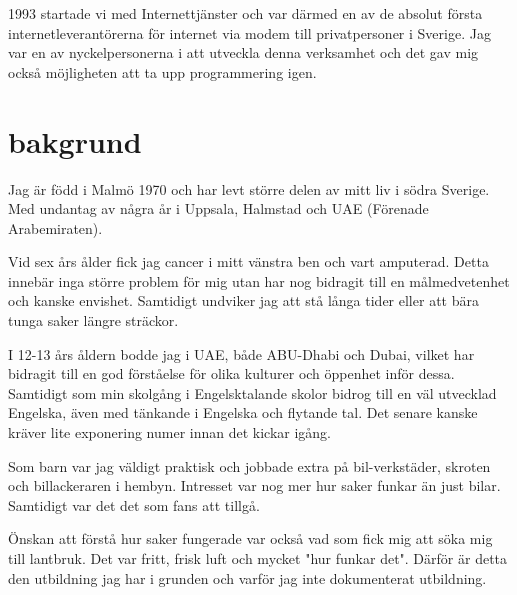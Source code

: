 \documentclass[]{cv-style}          %
\begin{document}
\begin{entrylist}
{    1993 startade vi med Internettjänster och var därmed en av de absolut första 
    internetleverantörerna för internet via modem till privatpersoner i Sverige.
    Jag var en av nyckelpersonerna i att utveckla denna verksamhet och det gav
    mig också möjligheten att ta upp programmering igen.

}
\pagebreak

\end{entrylist}


\section{bakgrund}
Jag är född i Malmö 1970 och har levt större delen av mitt liv i södra Sverige.
Med undantag av några år i Uppsala, Halmstad och UAE (Förenade Arabemiraten).

Vid sex års ålder fick jag cancer i mitt vänstra ben och vart amputerad. Detta
innebär inga större problem för mig utan har nog bidragit till en målmedvetenhet
och kanske envishet. Samtidigt undviker jag att stå långa tider eller att bära
tunga saker längre sträckor.

I 12-13 års åldern bodde jag i UAE, både ABU-Dhabi och Dubai, vilket har
bidragit till en god förståelse för olika kulturer och öppenhet inför dessa.
Samtidigt som min skolgång i Engelsktalande skolor bidrog till en väl utvecklad
Engelska, även med tänkande i Engelska och flytande tal. Det senare kanske
kräver lite exponering numer innan det kickar igång.

Som barn var jag väldigt praktisk och jobbade extra på bil-verkstäder, skroten
och billackeraren i hembyn. Intresset var nog mer hur saker funkar än just
bilar. Samtidigt var det det som fans att tillgå.

Önskan att förstå hur saker fungerade var också vad som fick mig att söka
mig till lantbruk. Det var fritt, frisk luft och mycket "hur funkar det".
Därför är detta den utbildning jag har i grunden och varför jag inte 
dokumenterat utbildning.
\end{document}
